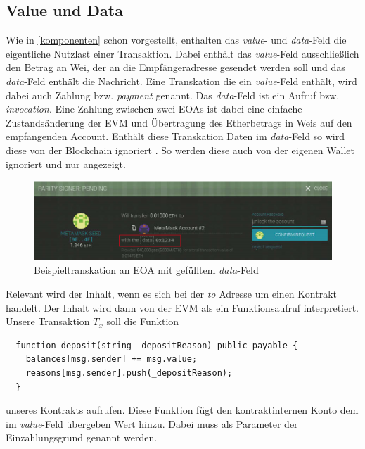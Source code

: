 \documentclass[runningheads]{llncs}
\begin{document}
\subsection{Value und Data}
Wie in \ref{komponenten} schon vorgestellt, enthalten das \textit{value}- und \textit{data}-Feld die eigentliche Nutzlast einer Transaktion. Dabei enthält das \textit{value}-Feld ausschließlich den Betrag an Wei, der an die Empfängeradresse gesendet werden soll und das \textit{data}-Feld enthält die Nachricht.
Eine Transkation die ein \textit{value}-Feld enthält, wird dabei auch Zahlung bzw. \textit{payment} genannt. Das \textit{data}-Feld ist ein Aufruf bzw. \textit{invocation}\cite[S.108]{antonopoulos_mastering_2019}. Eine Zahlung zwischen zwei EOAs ist dabei eine einfache Zustandsänderung der EVM und Übertragung des Etherbetrags in Weis auf den empfangenden Account. Enthält diese Transkation Daten im \textit{data}-Feld so wird diese von der Blockchain ignoriert \cite[S.10]{wood_ethereum/yellowpaper_2019}. So werden diese auch von der eigenen Wallet ignoriert und nur angezeigt.
\begin{figure}
  \includegraphics[width=\textwidth, keepaspectratio]{dataTransaction.png}
  \caption{Beispieltranskation an EOA mit gefülltem \textit{data}-Feld \cite[S.109]{antonopoulos_mastering_2019}}
\end{figure}
Relevant wird der Inhalt, wenn es sich bei der \textit{to} Adresse um einen Kontrakt handelt. Der Inhalt wird dann von der EVM als ein Funktionsaufruf interpretiert. Unsere Transaktion $T_x$ soll die Funktion\\
\begin{verbatim}
  function deposit(string _depositReason) public payable {
    balances[msg.sender] += msg.value;
    reasons[msg.sender].push(_depositReason);
  }
\end{verbatim}
unseres Kontrakts aufrufen. Diese Funktion fügt den kontraktinternen Konto dem im \textit{value}-Feld übergeben Wert hinzu. Dabei muss als Parameter der Einzahlungsgrund genannt werden. 
\end{document}
